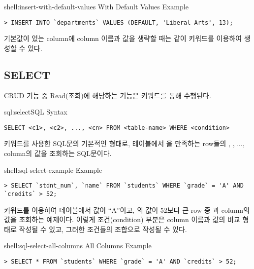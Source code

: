 \begin{shellenv}{shell:insert-with-default-values}{ With Default Values Example}\begin{verbatim}
> INSERT INTO `departments` VALUES (DEFAULT, 'Liberal Arts', 13);
\end{verbatim}
\end{shellenv}

기본값이 있는 column에 column 이름과 값을 생략할 때는 \와 같이  키워드를 이용하여 생성할 수 있다.
\clearpage

\subsection*{SELECT}

CRUD 기능 중 Read(조회)에 해당하는 기능은  키워드를 통해 수행된다.

\begin{sqlenv}{sql:select}{SQL  Syntax}\begin{verbatim}
SELECT <c1>, <c2>, ..., <cn> FROM <table-name> WHERE <condition>
\end{verbatim}
\end{sqlenv}

\는  키워드를 사용한 SQL문의 기본적인 형태로,  테이블에서 을 만족하는 row들의 , , ...,  column의 값을 조회하는 SQL문이다.

\begin{shellenv}{shell:sql-select-example}{ Example}\begin{verbatim}
> SELECT `stdnt_num`, `name` FROM `students` WHERE `grade` = 'A' AND `credits` > 52;
\end{verbatim}
\end{shellenv}

\은  키워드를 이용하여  테이블에서  값이 ``A''이고, 의 값이 52보다 큰 row 중 과  column의 값을 조회하는 예제이다. 이렇게 조건(condition) 부분은 column 이름과 값의 비교 형태로 작성될 수 있고, 그러한 조건들의 조합으로 작성될 수 있다.

\begin{shellenv}{shell:sql-select-all-columns}{ All Columns Example}\begin{verbatim}
> SELECT * FROM `students` WHERE `grade` = 'A' AND `credits` > 52;
\end{verbatim}
\end{shellenv}

